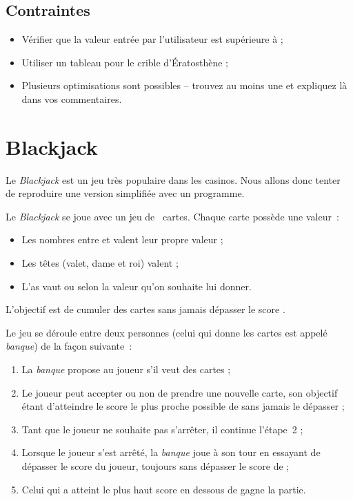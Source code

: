 \documentclass[a4paper]{article}
\begin{document}
		\subsection{Contraintes}
			\begin{itemize}
				\item Vérifier que la valeur entrée par l'utilisateur est supérieure à  ;
				\item Utiliser un tableau pour le crible d'Ératosthène ;
				\item Plusieurs optimisations sont possibles -- trouvez au moins une et expliquez là dans vos commentaires.
			\end{itemize}
		\clearpage

	\section{Blackjack}
		Le \emph{Blackjack} est un jeu très populaire dans les casinos.
		Nous allons donc tenter de reproduire une version simplifiée avec un programme.

		Le \emph{Blackjack} se joue avec un jeu de ~cartes.
		Chaque carte possède une valeur~:
		\begin{itemize}
			\item Les nombres entre  et  valent leur propre valeur ;
			\item Les têtes (valet, dame et roi) valent  ;
			\item L'as vaut  ou  selon la valeur qu'on souhaite lui donner.
		\end{itemize}
		L'objectif est de cumuler des cartes sans jamais dépasser le score .

		Le jeu se déroule entre deux personnes (celui qui donne les cartes est appelé \emph{banque}) de la façon suivante~:
		\begin{enumerate}
			\item La \emph{banque} propose au joueur s'il veut des cartes ;
			\item Le joueur peut accepter ou non de prendre une nouvelle carte, son objectif étant d'atteindre le score le plus proche possible de  sans jamais le dépasser ;
			\item Tant que le joueur ne souhaite pas s'arrêter, il continue l'étape~2 ;
			\item Lorsque le joueur s'est arrêté, la \emph{banque} joue à son tour en essayant de dépasser le score du joueur, toujours sans dépasser le score de  ;
			\item Celui qui a atteint le plus haut score en dessous de  gagne la partie.
		\end{enumerate}
\end{document}
